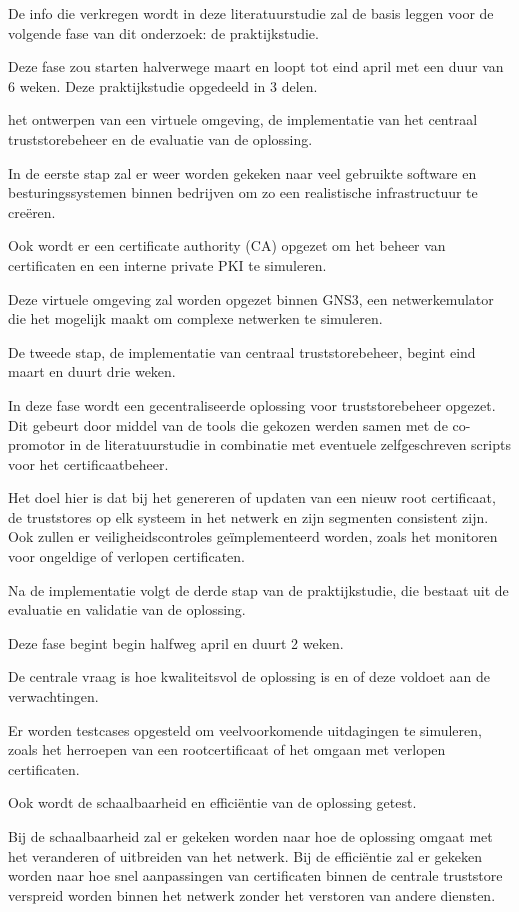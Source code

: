 De info die verkregen wordt in deze literatuurstudie zal de basis leggen voor de volgende fase van dit onderzoek: de praktijkstudie.

Deze fase zou starten halverwege maart en loopt tot eind april met een duur van 6 weken. Deze praktijkstudie opgedeeld in 3 delen.

het ontwerpen van een virtuele omgeving, de implementatie van het centraal truststorebeheer en de evaluatie van de oplossing.

In de eerste stap zal er weer worden gekeken naar veel gebruikte software en besturingssystemen binnen bedrijven om zo een realistische infrastructuur te creëren.

Ook wordt er een certificate authority (CA) opgezet om het beheer van certificaten en een interne private PKI te simuleren.

Deze virtuele omgeving zal worden opgezet binnen GNS3, een netwerkemulator die het mogelijk maakt om complexe netwerken te simuleren.

De tweede stap, de implementatie van centraal truststorebeheer, begint eind maart en duurt drie weken.

In deze fase wordt een gecentraliseerde oplossing voor truststorebeheer opgezet. Dit gebeurt door middel van de tools die gekozen werden samen met de co-promotor in de literatuurstudie in combinatie met eventuele zelfgeschreven scripts voor het certificaatbeheer.

Het doel hier is dat bij het genereren of updaten van een nieuw root certificaat, de truststores op elk systeem in het netwerk en zijn segmenten consistent zijn. Ook zullen er veiligheidscontroles geïmplementeerd worden, zoals het monitoren voor ongeldige of verlopen certificaten.

Na de implementatie volgt de derde stap van de praktijkstudie, die bestaat uit de evaluatie en validatie van de oplossing.

Deze fase begint begin halfweg april en duurt 2 weken.

De centrale vraag is hoe kwaliteitsvol de oplossing is en of deze voldoet aan de verwachtingen.

Er worden testcases opgesteld om veelvoorkomende uitdagingen te simuleren, zoals het herroepen van een rootcertificaat of het omgaan met verlopen certificaten.

Ook wordt de schaalbaarheid en efficiëntie van de oplossing getest.

Bij de schaalbaarheid zal er gekeken worden naar hoe de oplossing omgaat met het veranderen of uitbreiden van het netwerk. Bij de efficiëntie zal er gekeken worden naar hoe snel aanpassingen van certificaten binnen de centrale truststore verspreid worden binnen het netwerk zonder het verstoren van andere diensten.

